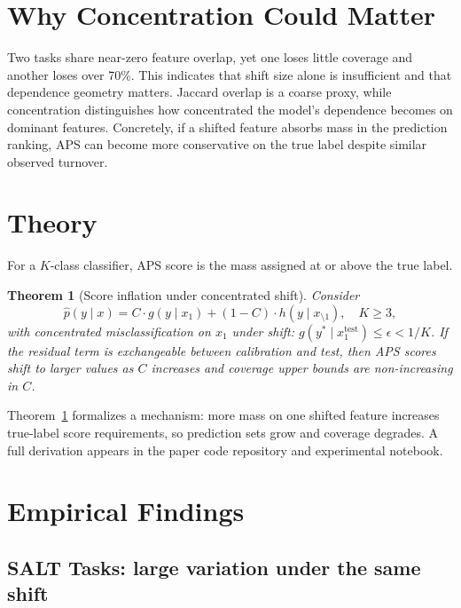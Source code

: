 \documentclass[sigconf,anonymous]{acmart}
\newtheorem{theorem}{Theorem}
\begin{document}
\section{Why Concentration Could Matter}
Two tasks share near-zero feature overlap, yet one loses little coverage and another loses over 70\%. This indicates that shift size alone is insufficient and that dependence geometry matters. Jaccard overlap is a coarse proxy, while concentration distinguishes how concentrated the 
model's dependence becomes on dominant features.
Concretely, if a shifted feature absorbs mass in the prediction ranking, APS can become more conservative on the true label despite similar observed turnover.

\section{Theory}
For a $K$-class classifier, APS score is the mass assigned at or above the true label.

\begin{theorem}[Score inflation under concentrated shift]
\label{thm:score_inflation}
Consider
\[
\hat p(y\mid x)=C\cdot g(y\mid x_1)+(1-C)\cdot h(y\mid x_{\setminus 1}),\quad K\ge3,
\]
with concentrated misclassification on $x_1$ under shift:
$g(y^\ast\mid x_1^{\text{test}})\le \epsilon<1/K$.
If the residual term is exchangeable between calibration and test, then APS scores
shift to larger values as $C$ increases and coverage upper bounds are non-increasing in $C$.
\end{theorem}

Theorem~\ref{thm:score_inflation} formalizes a mechanism: more mass on one shifted feature increases true-label score requirements, so prediction sets grow and coverage degrades. A full derivation appears in the paper code repository and experimental notebook.

\section{Empirical Findings}

\subsection{SALT Tasks: large variation under the same shift}
\end{document}
